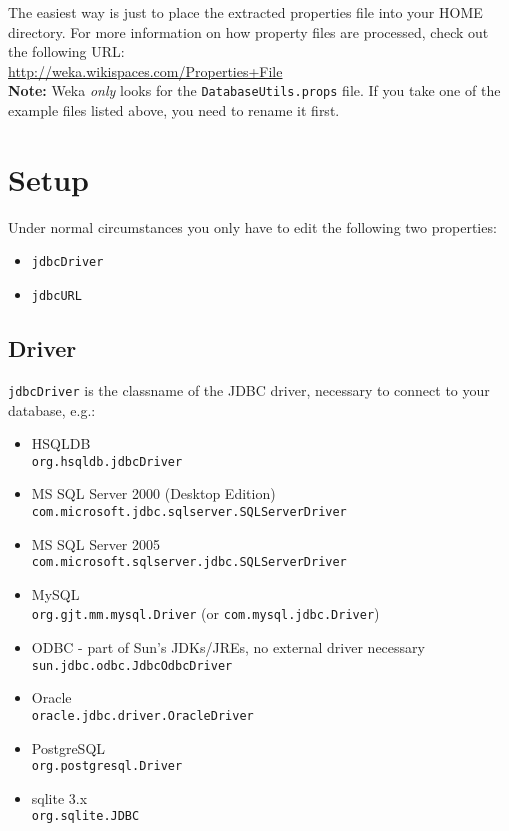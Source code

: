 The easiest way is just to place the extracted properties file into your HOME directory. For more information on how property files are processed, check out the following URL: \\

\url{http://weka.wikispaces.com/Properties+File}{} \\

\noindent \textbf{Note:} Weka \textit{only} looks for the \texttt{DatabaseUtils.props} file. If you take one of the example files listed above, you need to rename it first.


\section{Setup}
Under normal circumstances you only have to edit the following two properties:

\begin{itemize}
	\item \texttt{jdbcDriver}
	\item \texttt{jdbcURL}
\end{itemize}

\subsection*{Driver}
\texttt{jdbcDriver} is the classname of the JDBC driver, necessary to connect to your database, e.g.:

\begin{itemize}
	\item HSQLDB \\
	\texttt{org.hsqldb.jdbcDriver}
	\item MS SQL Server 2000 (Desktop Edition) \\
	\texttt{com.microsoft.jdbc.sqlserver.SQLServerDriver}
	\item MS SQL Server 2005 \\
	\texttt{com.microsoft.sqlserver.jdbc.SQLServerDriver}
	\item MySQL \\
	\texttt{org.gjt.mm.mysql.Driver} (or \texttt{com.mysql.jdbc.Driver})
	\item ODBC - part of Sun's JDKs/JREs, no external driver necessary \\
	\texttt{sun.jdbc.odbc.JdbcOdbcDriver}
	\item Oracle \\
	\texttt{oracle.jdbc.driver.OracleDriver}
	\item PostgreSQL \\
	\texttt{org.postgresql.Driver}
	\item sqlite 3.x \\
	\texttt{org.sqlite.JDBC}
\end{itemize}

